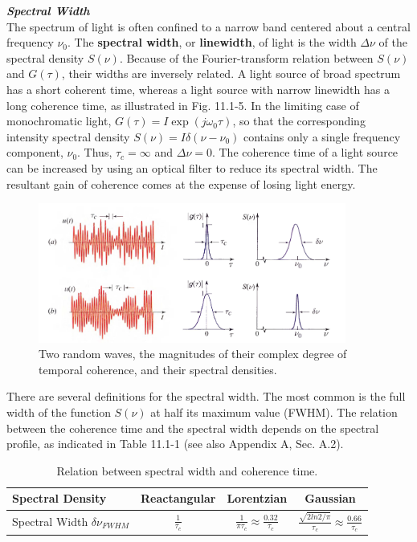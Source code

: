 \documentclass{article}
\numberwithin{figure}{subsection}
\numberwithin{table}{subsection}
\begin{document}
\bigbreak\noindent\textcolor{ksc}{\textbf{\textsl{Spectral Width}}}\\
The spectrum of light is often confined to a narrow band centered about a central frequency $ \nu_0 $. The \textbf{spectral width}, or \textbf{linewidth}, of light is the width $ \Delta \nu $ of the spectral density $ S(\nu) $. Because of the Fourier-transform relation between $ S(\nu) $ and $ G(\tau) $, their widths are inversely related. A light source of broad spectrum has a short coherent time, whereas a light source with narrow linewidth has a long coherence time, as illustrated in Fig. 11.1-5. In the limiting case of monochromatic light, $ G(\tau) = I \exp(j\omega_0 \tau) $, so that the corresponding intensity spectral density $ S(\nu) = I \delta (\nu - \nu_0) $ contains only a single frequency component, $ \nu_0 $. Thus, $ \tau_c = \infty $ and $ \Delta \nu = 0$. The coherence time of a light source can be increased by using an optical filter to reduce its spectral width. The resultant gain of coherence comes at the expense of losing light energy.
\begin{figure}[H]
\centering
\includegraphics[width=0.9\textwidth]{11_1_5.PNG}
\caption{Two random waves, the magnitudes of their complex degree of temporal coherence, and their spectral densities.}
\label{fig: 11_1_5}
\end{figure}
\par There are several definitions for the spectral width. The most common is the full width of the function $ S(\nu) $ at half its maximum value (FWHM). The relation between the coherence time and the spectral width depends on the spectral profile, as indicated in Table 11.1-1 (see also Appendix A, Sec. A.2).\\
\begin{table}
\caption{Relation between spectral width and coherence time.}
\begin{center}
\begin{tabular}{lccc}
\hline
Spectral Density & Reactangular & Lorentzian & Gaussian \\
\hline
Spectral Width $ \delta \nu_{FWHM} $ & $ \frac{1}{\tau_c} $ & $ \frac{1}{\pi \tau_c} \approx \frac{0.32}{\tau_c} $ & $ \frac{\sqrt{2 ln2 / \pi}}{\tau_c} \approx \frac{0.66}{\tau_c} $ \\
\hline
\end{tabular}
\end{center}
\end{table}
\end{document}
